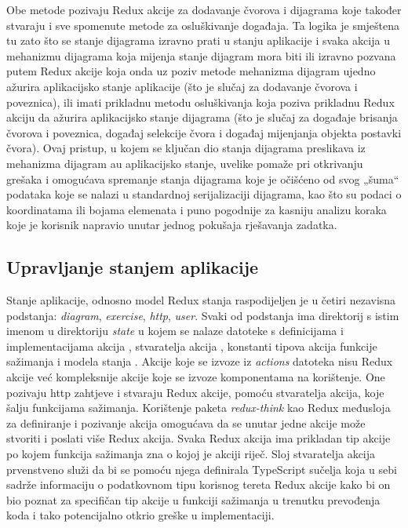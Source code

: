 \documentclass[times, utf8, diplomski, numeric]{fer}
\newcommand{\razmaks}{\vspace{10pt}}
\begin{document}
Obe metode pozivaju Redux akcije za dodavanje čvorova i dijagrama koje također stvaraju i sve spomenute metode za osluškivanje događaja.
Ta logika je smještena tu zato što se stanje dijagrama izravno prati u stanju aplikacije i svaka akcija u mehanizmu dijagrama koja mijenja stanje dijagram mora biti ili izravno pozvana putem Redux akcije koja onda uz poziv metode mehanizma dijagram ujedno ažurira aplikacijsko stanje aplikacije (što je slučaj za dodavanje čvorova i poveznica), ili imati prikladnu metodu osluškivanja koja poziva prikladnu Redux akciju da ažurira aplikacijsko stanje dijagrama (što je slučaj za događaje brisanja čvorova i poveznica, događaj selekcije čvora i događaj mijenjanja objekta postavki čvora).
Ovaj pristup, u kojem se ključan dio stanja dijagrama preslikava iz mehanizma dijagram au aplikacijsko stanje, uvelike pomaže pri otkrivanju grešaka i omogućava spremanje stanja dijagrama koje je očišćeno od svog „šuma“ podataka koje se nalazi u standardnoj serijalizaciji dijagrama, kao što su podaci o koordinatama ili bojama elemenata i puno pogodnije za kasniju analizu koraka koje je korisnik napravio unutar jednog pokušaja rješavanja zadatka.

\razmaks
\subsection{Upravljanje stanjem aplikacije} \label{sec:state}

Stanje aplikacije, odnosno model Redux stanja raspodijeljen je u četiri nezavisna podstanja: \emph{diagram}, \emph{exercise}, \emph{http}, \emph{user}.
Svaki od podstanja ima direktorij s istim imenom u direktoriju \emph{state} u kojem se nalaze datoteke s definicijama i implementacijama akcija , stvaratelja akcija , konstanti tipova akcija  funkcije sažimanja  i modela stanja .
Akcije koje se izvoze iz \emph{actions} datoteka nisu Redux akcije već kompleksnije akcije koje se izvoze komponentama na korištenje.
One pozivaju http zahtjeve i stvaraju Redux akcije, pomoću stvaratelja akcija, koje šalju  funkcijama sažimanja.
Korištenje paketa \emph{redux-think} kao Redux međusloja za definiranje i pozivanje akcija omogućava da se unutar jedne akcije može stvoriti i poslati više Redux akcija.
Svaka Redux akcija ima prikladan tip akcije po kojem funkcija sažimanja zna o kojoj je akciji riječ.
Sloj stvaratelja akcija prvenstveno služi da bi se pomoću njega definirala TypeScript sučelja koja u sebi sadrže informaciju o podatkovnom tipu korisnog tereta  Redux akcije kako bi on bio poznat za specifičan tip akcije u funkciji sažimanja u trenutku prevođenja koda i tako potencijalno otkrio greške u implementaciji.
\end{document}
